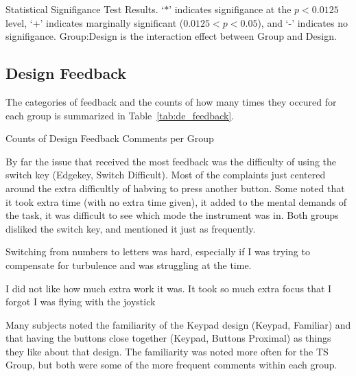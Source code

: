 \begin{table}
    \centering
    \caption{Statistical Signifigance Test Results. `$*$' indicates signifigance at the $p<0.0125$ level, `+' indicates marginally significant ($0.0125<p<0.05$), and `-' indicates no signifigance. Group:Design is the interaction effect between Group and Design.}
    \label{tab:de_anova}
\end{table}

\subsection{Design Feedback}

The categories of feedback and the counts of how many times they occured for each group is summarized in Table~\ref{tab:de_feedback}.

\begin{table}
    \centering
    \caption{Counts of Design Feedback Comments per Group}
    \label{tab:de_feedback}
\end{table}

By far the issue that received the most feedback was the difficulty of using the switch key (Edgekey, Switch Difficult).
Most of the complaints just centered around the extra difficultly of habving to press another button.
Some noted that it took extra time (with no extra time given), it added to the mental demands of the task, it was difficult to see which mode the instrument was in.
Both groups disliked the switch key, and mentioned it just as frequently.
\begin{displayquote}[TS Subject]
    Switching from numbers to letters was hard, especially if I was trying to compensate for turbulence and was struggling at the time.
\end{displayquote}
\begin{displayquote}[VR Subject]
    I did not like how much extra work it was. It took so much extra focus that I forgot I was flying with the joystick
\end{displayquote}

Many subjects noted the familiarity of the Keypad design (Keypad, Familiar) and that having the buttons close together (Keypad, Buttons Proximal) as things they like about that design.
The familiarity was noted more often for the TS Group, but both were some of the more frequent comments within each group.

